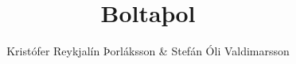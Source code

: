 \author{Kristófer Reykjalín Þorláksson \& Stefán Óli Valdimarsson}  %
\title{Boltaþol}  %

\graphicspath{{graphics/}{Graphics/}{./}}

\usepackage[backend=biber, bibencoding=utf8, style=ieee]{biblatex}



\usepackage[final,hidelinks]{hyperref} %


\usepackage{gensymb}


%
